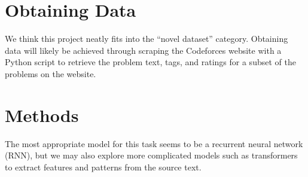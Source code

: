 \documentclass{article}
\begin{document}
        \section{Obtaining Data}    
 We think this project neatly fits into the ``novel dataset'' category. Obtaining data will likely be achieved through scraping the Codeforces website with a Python script to retrieve the problem text, tags, and ratings for a subset of the problems on the website. 

        \section{Methods}
 The most appropriate model for this task seems to be a recurrent neural network (RNN), but we may also explore more complicated models such as transformers to extract features and patterns from the source text.
\end{document}
